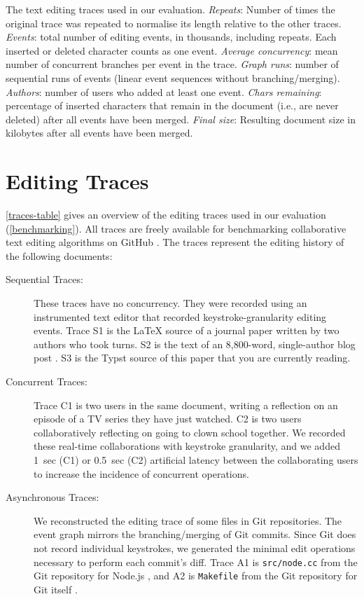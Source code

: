 \documentclass[sigplan,10pt]{acmart}
\begin{document}
\begin{table}
  \caption{The text editing traces used in our evaluation.
    \emph{Repeats}: Number of times the original trace was repeated to normalise its length relative to the other traces.
    \emph{Events}: total number of editing events, in thousands, including repeats. Each inserted or deleted character counts as one event.
    \emph{Average concurrency}: mean number of concurrent branches per event in the trace.
    \emph{Graph runs}: number of sequential runs of events (linear event sequences without branching/merging).
    \emph{Authors}: number of users who added at least one event.
    \emph{Chars remaining}: percentage of inserted characters that remain in the document (i.e., are never deleted) after all events have been merged.
    \emph{Final size}: Resulting document size in kilobytes after all events have been merged.
  }
  \label{traces-table}
  \footnotesize
\end{table}

\newpage
\section{Editing Traces}\label{traces-appendix}

\autoref{traces-table} gives an overview of the editing traces used in our evaluation (\autoref{benchmarking}).
All traces are freely available for benchmarking collaborative text editing algorithms on GitHub \cite{editing-traces}.
The traces represent the editing history of the following documents:

\begin{description}
    \item[Sequential Traces:] These traces have no concurrency. They were recorded using an instrumented text editor that recorded keystroke-granularity editing events. Trace S1 is the LaTeX source of a journal paper \cite{Kleppmann2017,automerge-perf} written by two authors who took turns. S2 is the text of an 8,800-word, single-author blog post \cite{crdts-go-brrr}. S3 is the Typst source of this paper that you are currently reading.
    \item[Concurrent Traces:] Trace C1 is two users in the same document, writing a reflection on an episode of a TV series they have just watched. C2 is two users collaboratively reflecting on going to clown school together. We recorded these real-time collaborations with keystroke granularity, and we added 1~sec (C1) or 0.5~sec (C2) artificial latency between the collaborating users to increase the incidence of concurrent operations.
    \item[Asynchronous Traces:] We reconstructed the editing trace of some files in Git repositories. The event graph mirrors the branching/merging of Git commits. Since Git does not record individual keystrokes, we generated the minimal edit operations necessary to perform each commit's diff. Trace A1 is \texttt{src/node.cc} from the Git repository for Node.js \cite{node-src-nodecc}, and A2 is \texttt{Makefile} from the Git repository for Git itself \cite{git-makefile}.
\end{description}
\end{document}
